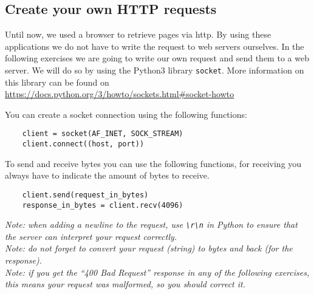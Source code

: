 \newpage
\subsection{Create your own HTTP requests}
Until now, we used a browser to retrieve pages via \ac{http}. By using these applications we do not have to write the request to web servers ourselves. In the following exercises we are going to write our own request and send them to a web server. We will do so by using the Python3 library \texttt{socket}. More information on this library can be found on \url{https://docs.python.org/3/howto/sockets.html#socket-howto}

You can create a socket connection using the following functions:
\begin{lstlisting}
    client = socket(AF_INET, SOCK_STREAM)
    client.connect((host, port))
\end{lstlisting} 
   
To send and receive bytes you can use the following functions, for receiving you always have to indicate the amount of bytes to receive.
\begin{lstlisting}
    client.send(request_in_bytes)
    response_in_bytes = client.recv(4096)
\end{lstlisting}

\emph{Note: when adding a newline to the request, use \texttt{\textbackslash r\textbackslash n} in Python to ensure that the server can interpret your request correctly.}\\
\emph{Note: do not forget to convert your request (string) to bytes and back (for the response).}\\
\emph{Note: if you get the ``400 Bad Request'' response in any of the following exercises, this means your request was malformed, so you should correct it.}

